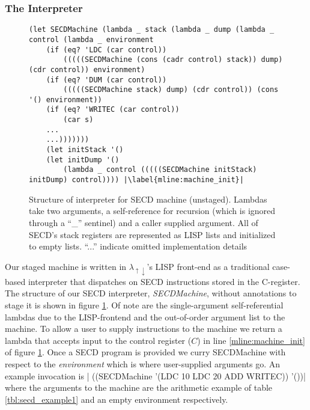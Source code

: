 \documentclass[a4paper,12pt,twoside,openright]{report}
\theoremstyle{definition}
\newcommand{\mslang}{$\lambda_{\uparrow\downarrow}$}
\begin{document}

\newpage
\subsubsection{The Interpreter}\label{subsec:secd_interp}
\begin{figure}[htp!]
\centering
\begin{verbatim}
(let SECDMachine (lambda _ stack (lambda _ dump (lambda _ control (lambda _ environment
    (if (eq? 'LDC (car control))
        (((((SECDMachine (cons (cadr control) stack)) dump) (cdr control)) environment)
    (if (eq? 'DUM (car control))
        (((((SECDMachine stack) dump) (cdr control)) (cons '() environment))
    (if (eq? 'WRITEC (car control))
        (car s)
    ...
    ...)))))))
    (let initStack '()
    (let initDump '()
        (lambda _ control (((((SECDMachine initStack) initDump) control)))) |\label{mline:machine_init}|
\end{verbatim}
\caption{Structure of interpreter for SECD machine (unstaged). Lambdas take two arguments, a self-reference for recursion (which is ignored through a ``\_'' sentinel) and a caller supplied argument. All of SECD's stack registers are represented as LISP lists and initialized to empty lists. ``...'' indicate omitted implementation details}
\label{lst:secd_unstaged}
\end{figure}

Our staged machine is written in \mslang's LISP front-end as a traditional case-based interpreter that dispatches on SECD instructions stored in the C-register. The structure of our SECD interpreter, \textit{SECDMachine}, without annotations to stage it is shown in figure \ref{lst:secd_unstaged}. Of note are the single-argument self-referential lambdas due to the LISP-frontend and the out-of-order argument list to the machine. To allow a user to supply instructions to the machine we return a lambda that accepts input to the control register ($C$) in line \ref{mline:machine_init} of figure \ref{lst:secd_unstaged}. Once a SECD program is provided we curry SECDMachine with respect to the \textit{environment} which is where user-supplied arguments go. An example invocation is |  ((SECDMachine '(LDC 10 LDC 20 ADD WRITEC)) '())| where the arguments to the machine are the arithmetic example of table \ref{tbl:secd_example1} and an empty environment respectively.
\end{document}
